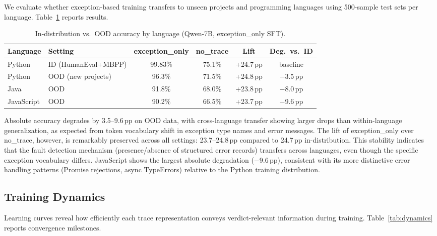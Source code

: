 \documentclass[11pt,a4paper]{article}
\newcommand{\pp}{\,pp}
\begin{document}
We evaluate whether exception-based training transfers to unseen projects and programming languages using 500-sample test sets per language. Table~\ref{tab:ood} reports results.

\begin{table}[t]
\centering
\caption{In-distribution vs.\ OOD accuracy by language (Qwen-7B, exception\_only SFT).}
\label{tab:ood}
\small
\begin{tabular}{@{}llcccc@{}}
\toprule
Language & Setting & exception\_only & no\_trace & Lift & Deg.\ vs.\ ID \\
\midrule
Python & ID (HumanEval+MBPP)  & 99.83\% & 75.1\% & +24.7\pp & baseline \\
Python & OOD (new projects)   & 96.3\%  & 71.5\% & +24.8\pp & $-$3.5\pp \\
Java   & OOD                  & 91.8\%  & 68.0\% & +23.8\pp & $-$8.0\pp \\
JavaScript & OOD              & 90.2\%  & 66.5\% & +23.7\pp & $-$9.6\pp \\
\bottomrule
\end{tabular}
\end{table}

Absolute accuracy degrades by 3.5--9.6\pp{} on OOD data, with cross-language transfer showing larger drops than within-language generalization, as expected from token vocabulary shift in exception type names and error messages. The lift of exception\_only over no\_trace, however, is remarkably preserved across all settings: 23.7--24.8\pp{} compared to 24.7\pp{} in-distribution. This stability indicates that the fault detection mechanism (presence/absence of structured error records) transfers across languages, even though the specific exception vocabulary differs. JavaScript shows the largest absolute degradation ($-$9.6\pp), consistent with its more distinctive error handling patterns (Promise rejections, async TypeErrors) relative to the Python training distribution.

\subsection{Training Dynamics}
\label{sec:dynamics}

Learning curves reveal how efficiently each trace representation conveys verdict-relevant information during training. Table~\ref{tab:dynamics} reports convergence milestones.
\end{document}
